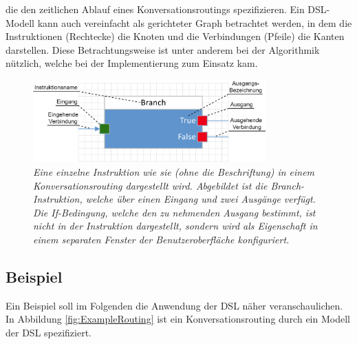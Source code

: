 die den zeitlichen Ablauf eines Konversationsroutings spezifizieren. Ein DSL-Modell kann auch vereinfacht als gerichteter Graph betrachtet werden, in dem die Instruktionen (Rechtecke) die Knoten und die Verbindungen (Pfeile) die Kanten darstellen. Diese Betrachtungsweise ist unter anderem bei der Algorithmik nützlich, welche bei der Implementierung zum Einsatz kam.
\begin{figure} %
	\centering
		\includegraphics[width=0.8\textwidth]{img/SingleNodeWithAnnotations.png}
	\caption[Beschriftung einer DSL-Instruktion]{\textit{Eine einzelne Instruktion wie sie (ohne die Beschriftung) in einem Konversationsrouting dargestellt wird. Abgebildet ist die Branch-Instruktion, welche über einen Eingang und zwei Ausgänge verfügt. Die If-Bedingung, welche den zu nehmenden Ausgang bestimmt, ist nicht in der Instruktion dargestellt, sondern wird als Eigenschaft in einem separaten Fenster der Benutzeroberfläche konfiguriert.}}
	\label{fig:SingleNode}
\end{figure}

\subsection{Beispiel}
Ein Beispiel soll im Folgenden die Anwendung der DSL näher veranschaulichen. In Abbildung \ref{fig:ExampleRouting} ist ein Konversationsrouting durch ein Modell der DSL spezifiziert. 

